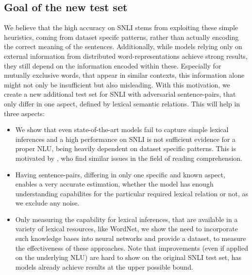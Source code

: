 \subsection{Goal of the new test set}
We believe that the high accuracy on \ac{SNLI} stems from exploiting these simple heuristics, coming from dataset specifc patterns, rather than actually encoding the correct meaning of the sentences. Additionally, while models relying only on external information from distributed word-representations achieve strong results, they still depend on the information encoded within these. Especially for mutually exclusive words, that appear in similar contexts, this information alone might not only be insufficient but also misleading. With this motivation, we create a new additional test set \citep{glockner_acl18} for \ac{SNLI} with adversarial sentence-pairs, that only differ in one aspect, defined by lexical semantic relations. This will help in three aspects:
\begin{itemize} 
\item We show that even state-of-the-art models fail to capture simple lexical inferences and a high performance on \ac{SNLI} is not sufficient evidence for a proper \ac{NLU}, being heavily dependent on dataset specific patterns. This is motivated by \cite{jia-liang:2017:EMNLP2017}, who find similar issues in the field of reading comprehension.
\item Having sentence-pairs, differing in only one specific and known aspect, enables a very accurate estimation, whether the model has enough understanding capabilites for the particular required lexical relation or not, as we exclude any noise.
\item Only measuring the capability for lexical inferences, that are available in a variety of lexical resources, like WordNet, we show the need to incorporate such knowledge bases into neural networks and provide a dataset, to measure the effectiveness of these approaches. Note that improvements (even if applied on the underlying \ac{NLU}) are hard to show on the original \ac{SNLI} test set, has models already achieve results at the upper possible bound.
\end{itemize}
